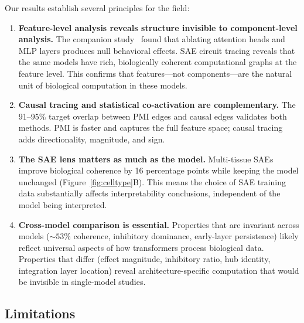 \documentclass[onecolumn]{article}
\begin{document}
Our results establish several principles for the field:

\begin{enumerate}
\item \textbf{Feature-level analysis reveals structure invisible to component-level analysis.} The companion study~\citep{kendiukhov2025systematic} found that ablating attention heads and MLP layers produces null behavioral effects. SAE circuit tracing reveals that the same models have rich, biologically coherent computational graphs at the feature level. This confirms that features---not components---are the natural unit of biological computation in these models.

\item \textbf{Causal tracing and statistical co-activation are complementary.} The 91--95\% target overlap between PMI edges and causal edges validates both methods. PMI is faster and captures the full feature space; causal tracing adds directionality, magnitude, and sign.

\item \textbf{The SAE lens matters as much as the model.} Multi-tissue SAEs improve biological coherence by 16 percentage points while keeping the model unchanged (Figure~\ref{fig:celltype}B). This means the choice of SAE training data substantially affects interpretability conclusions, independent of the model being interpreted.

\item \textbf{Cross-model comparison is essential.} Properties that are invariant across models (${\sim}53\%$ coherence, inhibitory dominance, early-layer persistence) likely reflect universal aspects of how transformers process biological data. Properties that differ (effect magnitude, inhibitory ratio, hub identity, integration layer location) reveal architecture-specific computation that would be invisible in single-model studies.
\end{enumerate}

\subsection{Limitations}
\end{document}
